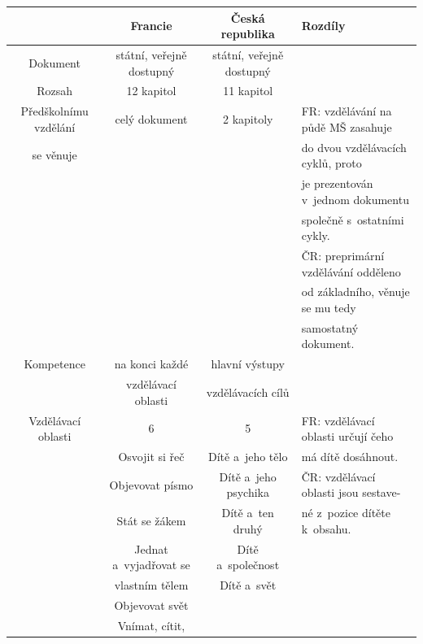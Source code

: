 \begin{landscape}
\begin{table}[t]
\center
\begin{tabular}{|c|c|c|l|}
\rowcolor{grey}
\hline			
				& \textbf{Francie}			& \textbf{Česká republika}	& \textbf{Rozdíly} 	\\
\hline
\hline
\rowcolor{grey!10}
Dokument	& státní, veřejně dostupný		& státní, veřejně dostupný 	& 			\\	\rowcolor{grey!50}
Rozsah		& 12 kapitol	 				& 11 kapitol	&						\\  \rowcolor{grey!10}
Předškolnímu vzdělání	& celý dokument			& 2 kapitoly	& FR: vzdělávání na půdě MŠ  zasahuje 	\\ \rowcolor{grey!10}
se věnuje				&						&				& do dvou vzdělávacích cyklů, proto  	\\ \rowcolor{grey!10}
				&								& 				& je prezentován v~jednom dokumentu  	\\ \rowcolor{grey!10}
				&								&				& společně s~ostatními cykly.    		\\ \rowcolor{grey!10}
				&								&				& ČR: preprimární vzdělávání odděleno 	\\ \rowcolor{grey!10}
				&								&				& od základního, věnuje se mu tedy  	\\ \rowcolor{grey!10}
				&								&				& samostatný dokument.					\\ 
\rowcolor{grey!50}
Kompetence		& na konci každé 				& hlavní výstupy  	&		\\	\rowcolor{grey!50}
				& vzdělávací oblasti 			& vzdělávacích cílů & 		\\
\rowcolor{grey!10}
Vzdělávací oblasti	& 6							& 5 					& FR: vzdělávací oblasti určují čeho 	\\	
\rowcolor{grey!10}
					& Osvojit si řeč			& Dítě a~jeho tělo		& má dítě dosáhnout.					\\
\rowcolor{grey!10}
					& Objevovat písmo 			& Dítě a~jeho psychika	& ČR: vzdělávací oblasti jsou sestave- \\
\rowcolor{grey!10}
					& Stát se žákem				& Dítě a~ten druhý	 	& né z~pozice dítěte k~obsahu. 			\\
\rowcolor{grey!10}
					& Jednat a~vyjadřovat se 	& Dítě a~společnost 	& 	 									\\
\rowcolor{grey!10}
					& vlastním tělem			& Dítě a~svět			& 	 									\\
\rowcolor{grey!10}
					& Objevovat svět			& 			 			& 	\\	
\rowcolor{grey!10}
					& Vnímat, cítit, 			& 						& 	\\

\end{tabular}
\end{table}
\end{landscape}
